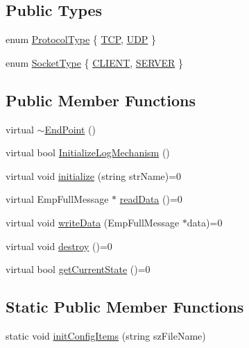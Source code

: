 \subsection*{Public Types}
\begin{DoxyCompactItemize}
\item 
enum \hyperlink{classipc_1_1EndPoint_adcdf30d3a61d3d342529b1fb8b0bbd72}{Protocol\+Type} \{ \hyperlink{classipc_1_1EndPoint_adcdf30d3a61d3d342529b1fb8b0bbd72a79ed024dca934b3dbe5150c824fa3f85}{T\+CP}, 
\hyperlink{classipc_1_1EndPoint_adcdf30d3a61d3d342529b1fb8b0bbd72a2e5b645e7fb05031f1c75d298db757b2}{U\+DP}
 \}
\item 
enum \hyperlink{classipc_1_1EndPoint_a5953c087a804e7c8c3e31fd97350b68a}{Socket\+Type} \{ \hyperlink{classipc_1_1EndPoint_a5953c087a804e7c8c3e31fd97350b68aaf20bc95cd10cd3a2dc9555f8affb9a75}{C\+L\+I\+E\+NT}, 
\hyperlink{classipc_1_1EndPoint_a5953c087a804e7c8c3e31fd97350b68aad92a281a0515f3dce327f63615417ae4}{S\+E\+R\+V\+ER}
 \}
\end{DoxyCompactItemize}
\subsection*{Public Member Functions}
\begin{DoxyCompactItemize}
\item 
virtual \hyperlink{classipc_1_1EndPoint_ad63e740860405b2073d51944accf3711}{$\sim$\+End\+Point} ()
\item 
virtual bool \hyperlink{classipc_1_1EndPoint_a11e6ea3b42eb264cd661abcd5c7398f4}{Initialize\+Log\+Mechanism} ()
\item 
virtual void \hyperlink{classipc_1_1EndPoint_a3a0ed19000bba31336d9e2d3f23e9e88}{initialize} (string str\+Name)=0
\item 
virtual Emp\+Full\+Message $\ast$ \hyperlink{classipc_1_1EndPoint_a6617ccd3bd8d8d314292db6ef3c9e7d5}{read\+Data} ()=0
\item 
virtual void \hyperlink{classipc_1_1EndPoint_a3dfd16e4b75e507f8c5fe9961934aa37}{write\+Data} (Emp\+Full\+Message $\ast$data)=0
\item 
virtual void \hyperlink{classipc_1_1EndPoint_a8d30be1048be238f4cef3240bfca143d}{destroy} ()=0
\item 
virtual bool \hyperlink{classipc_1_1EndPoint_a06f4cd9d1be23823c1f772da48779b58}{get\+Current\+State} ()=0
\end{DoxyCompactItemize}
\subsection*{Static Public Member Functions}
\begin{DoxyCompactItemize}
\item 
static void \hyperlink{classipc_1_1EndPoint_a22056e8bbdf6d8b1d901335acb7bdfba}{init\+Config\+Items} (string sz\+File\+Name)
\end{DoxyCompactItemize}
